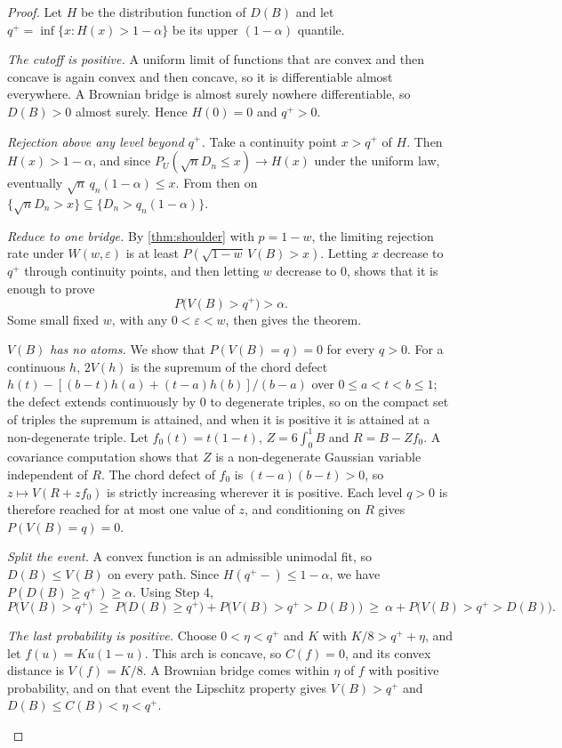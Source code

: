 \begin{proof}
Let $H$ be the distribution function of $D(B)$ and let $q^+=\inf\{x:H(x)>1-\alpha\}$ be its upper $(1-\alpha)$ quantile.
\begin{steps}
\item \emph{The cutoff is positive.} A uniform limit of functions that are convex and then concave is again convex and then concave, so it is differentiable almost everywhere. A Brownian bridge is almost surely nowhere differentiable, so $D(B)>0$ almost surely. Hence $H(0)=0$ and $q^+>0$.
\item \emph{Rejection above any level beyond $q^+$.} Take a continuity point $x>q^+$ of $H$. Then $H(x)>1-\alpha$, and since $P_U(\sqrt nD_n\le x)\to H(x)$ under the uniform law, eventually $\sqrt n\,q_n(1-\alpha)\le x$. From then on $\{\sqrt nD_n>x\}\subseteq\{D_n>q_n(1-\alpha)\}$.
\item \emph{Reduce to one bridge.} By \cref{thm:shoulder} with $p=1-w$, the limiting rejection rate under $W(w,\varepsilon)$ is at least $P(\sqrt{1-w}\,V(B)>x)$. Letting $x$ decrease to $q^+$ through continuity points, and then letting $w$ decrease to $0$, shows that it is enough to prove
\[
P\bigl(V(B)>q^+\bigr)>\alpha .
\]
Some small fixed $w$, with any $0<\varepsilon<w$, then gives the theorem.
\item \emph{$V(B)$ has no atoms.} We show that $P(V(B)=q)=0$ for every $q>0$. For a continuous $h$, $2V(h)$ is the supremum of the chord defect $h(t)-[(b-t)h(a)+(t-a)h(b)]/(b-a)$ over $0\le a<t<b\le1$; the defect extends continuously by $0$ to degenerate triples, so on the compact set of triples the supremum is attained, and when it is positive it is attained at a non-degenerate triple. Let $f_0(t)=t(1-t)$, $Z=6\int_0^1B$ and $R=B-Zf_0$. A covariance computation shows that $Z$ is a non-degenerate Gaussian variable independent of $R$. The chord defect of $f_0$ is $(t-a)(b-t)>0$, so $z\mapsto V(R+zf_0)$ is strictly increasing wherever it is positive. Each level $q>0$ is therefore reached for at most one value of $z$, and conditioning on $R$ gives $P(V(B)=q)=0$.
\item \emph{Split the event.} A convex function is an admissible unimodal fit, so $D(B)\le V(B)$ on every path. Since $H(q^+-)\le1-\alpha$, we have $P(D(B)\ge q^+)\ge\alpha$. Using Step 4,
\[
P\bigl(V(B)>q^+\bigr)\ \ge\ P\bigl(D(B)\ge q^+\bigr)+P\bigl(V(B)>q^+>D(B)\bigr)\ \ge\ \alpha+P\bigl(V(B)>q^+>D(B)\bigr).
\]
\item \emph{The last probability is positive.} Choose $0<\eta<q^+$ and $K$ with $K/8>q^++\eta$, and let $f(u)=Ku(1-u)$. This arch is concave, so $C(f)=0$, and its convex distance is $V(f)=K/8$. A Brownian bridge comes within $\eta$ of $f$ with positive probability, and on that event the Lipschitz property gives $V(B)>q^+$ and $D(B)\le C(B)<\eta<q^+$.\qedhere
\end{steps}
\end{proof}


